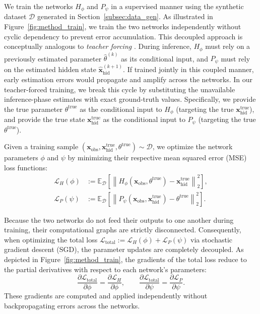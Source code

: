 We train the networks $H_\phi$ and $P_\psi$ in a supervised manner using the synthetic dataset $\mathcal{D}$ generated in Section~\ref{subsec:data_gen}. 
As illustrated in Figure~\ref{fig:method_train}, we train the two networks independently without cyclic dependency to prevent error accumulation. 
This decoupled approach is conceptually analogous to \emph{teacher forcing} \cite{williams1989learning}. 
During inference, $H_\phi$ must rely on a previously estimated parameter $\hat{\theta}^{(k)}$ as its conditional input, and $P_\psi$ must rely on the estimated hidden state $\hat{\mathbf{x}}_{\mathrm{hid}}^{(k+1)}$.
If trained jointly in this coupled manner, early estimation errors would propagate and amplify across the networks.
In our teacher-forced training, we break this cycle by substituting the unavailable inference-phase estimates with exact ground-truth values. 
Specifically, we provide the true parameter $\theta^\mathrm{true}$ as the conditional input to $H_\phi$ (targeting the true $\mathbf{x}_{\mathrm{hid}}^\mathrm{true}$), and provide the true state $\mathbf{x}_{\mathrm{hid}}^\mathrm{true}$ as the conditional input to $P_\psi$ (targeting the true $\theta^\mathrm{true}$).

Given a training sample $(\mathbf{x}_{\mathrm{obs}}, \mathbf{x}_{\mathrm{hid}}^\mathrm{true}, \theta^\mathrm{true}) \sim \mathcal{D}$, we optimize the network parameters $\phi$ and $\psi$ by minimizing their respective mean squared error (MSE) loss functions:
\begin{align}
    \mathcal{L}_H(\phi) &:= \mathbb{E}_{\mathcal{D}} \left[ \left\| H_\phi(\mathbf{x}_{\mathrm{obs}}, \theta^\mathrm{true}) - \mathbf{x}_{\mathrm{hid}}^\mathrm{true} \right\|_2^2 \right], \label{eq:loss_h} \\
    \mathcal{L}_P(\psi) &:= \mathbb{E}_{\mathcal{D}} \left[ \left\| P_\psi(\mathbf{x}_{\mathrm{obs}}, \mathbf{x}_{\mathrm{hid}}^\mathrm{true}) - \theta^\mathrm{true} \right\|_2^2 \right]. \label{eq:loss_p}
\end{align}

Because the two networks do not feed their outputs to one another during training, their computational graphs are strictly disconnected. 
Consequently, when optimizing the total loss $\mathcal{L}_{\mathrm{total}} := \mathcal{L}_H(\phi) + \mathcal{L}_P(\psi)$ via stochastic gradient descent (SGD), the parameter updates are completely decoupled. 
As depicted in Figure~\ref{fig:method_train}, the gradients of the total loss reduce to the partial derivatives with respect to each network's parameters:
\begin{equation}
    \frac{\partial \mathcal{L}_{\mathrm{total}}}{\partial \phi} = \frac{\partial \mathcal{L}_H}{\partial \phi}, \qquad \frac{\partial \mathcal{L}_{\mathrm{total}}}{\partial \psi} = \frac{\partial \mathcal{L}_P}{\partial \psi}.
\end{equation}
These gradients are computed and applied independently without backpropagating errors across the networks. 

